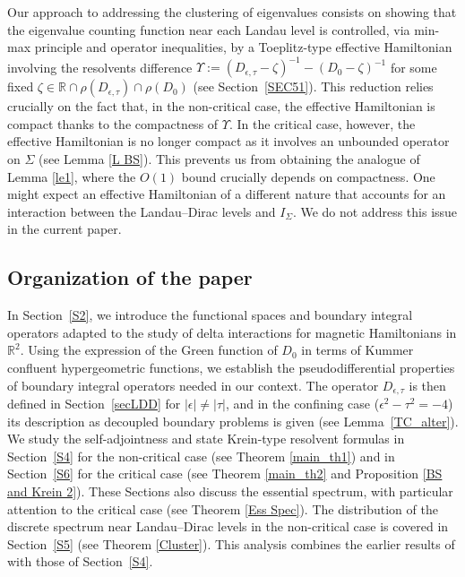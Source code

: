 \documentclass[11pt,a4paper,reqno,oneside]{amsproc}
\def \rr {{\mathbb R}}
\numberwithin{equation}{section}
\begin{document}
Our approach to addressing the clustering of eigenvalues consists on showing that the eigenvalue counting function near each Landau level is controlled, via min-max principle and operator inequalities,  by a Toeplitz-type effective Hamiltonian involving the resolvents difference $\Upsilon:= (D_{\epsilon,\tau}-\zeta)^{-1}-(D_{0}-\zeta)^{-1}$ for some fixed $\zeta\in \rr\cap\rho(D_{\epsilon,\tau})\cap\rho(D_0)$ (see Section~\ref{SEC51}). This reduction relies crucially on the fact that, in the non-critical case, the effective Hamiltonian is compact thanks to the compactness of $\Upsilon$. In the critical case, however,  the effective Hamiltonian is no longer compact as it involves an unbounded operator on $\Sigma$ (see Lemma \ref{L BS}).   This prevents us from obtaining the analogue of Lemma \ref{le1}, where the $O(1)$  bound crucially depends on compactness. One might expect an effective Hamiltonian of a different nature that accounts for an interaction between the Landau--Dirac levels and $I_\Sigma$. We do not address this  issue in the current paper.

\subsection*{Organization of the paper} 
In Section~\ref{S2}, we introduce the functional spaces and boundary integral operators adapted to the study of  delta interactions for magnetic Hamiltonians in $\rr^2$. Using the expression of the Green function of $D_0$ in terms of Kummer confluent hypergeometric functions, we establish the pseudodifferential properties of boundary integral operators needed in our context. The operator $D_{\epsilon, \tau}$ is then defined in Section~\ref{secLDD} for $|\epsilon | \neq | \tau |$, and in the confining case ($\epsilon^2-\tau^2 = -4$) its description as decoupled boundary problems is given  (see Lemma~\ref{TC_alter}). 
We study the self-adjointness and state Krein-type resolvent formulas in Section~\ref{S4} for the non-critical case (see Theorem \ref{main_th1})  and in Section~\ref{S6} for the critical case (see Theorem \ref{main_th2} and Proposition \ref{BS and Krein 2}). These Sections also discuss the essential spectrum, with particular attention to the critical case (see Theorem \ref{Ess Spec}). The distribution of the discrete spectrum near Landau--Dirac levels in the non-critical case is covered in Section~\ref{S5} (see Theorem \ref{Cluster}). This analysis combines the earlier results of \cite{PushRoz07,BM} with those of Section~\ref{S4}. 
\end{document}
